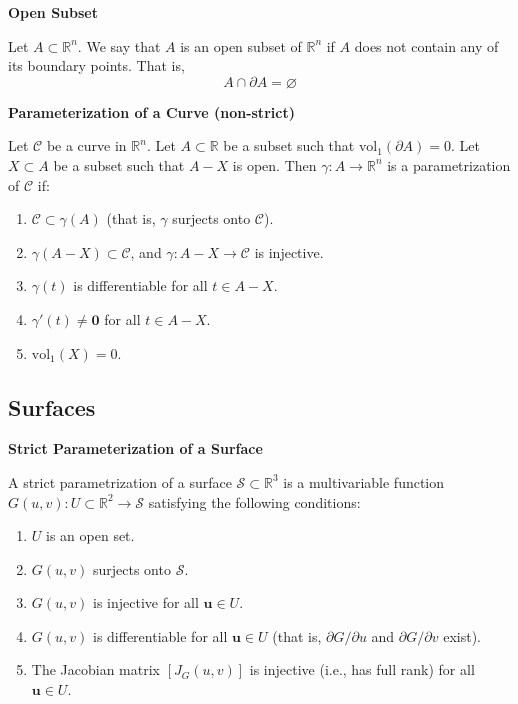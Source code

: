 \documentclass{article}
\newenvironment{definition}[1]{
    \par\noindent\textbf{#1}\par\noindent
}{
    \par \vspace{0.5cm}
}
\begin{document}
\begin{definition}{Open Subset}
Let \(A \subset \mathbb{R}^n\). We say that \(A\) is an open subset of \(\mathbb{R}^n\) if \(A\) does not contain any of its boundary points. That is,
\[ A \cap \partial A = \varnothing \]
\end{definition}

\begin{definition}{Parameterization of a Curve (non-strict)}
Let \(\mathcal{C}\) be a curve in \(\mathbb{R}^n\). Let \(A \subset \mathbb{R}\) be a subset such that \(\text{vol}_1(\partial A) = 0\). Let \(X \subset A\) be a subset such that \(A - X\) is open. Then \(\gamma: A \to \mathbb{R}^n\) is a parametrization of \(\mathcal{C}\) if:
\begin{enumerate}
    \item \(\mathcal{C} \subset \gamma(A)\) (that is, \(\gamma\) surjects onto \(\mathcal{C}\)).
    \item \(\gamma(A - X) \subset \mathcal{C}\), and \(\gamma: A - X \to \mathcal{C}\) is injective.
    \item \(\gamma(t)\) is differentiable for all \(t \in A - X\).
    \item \(\gamma'(t) \neq \bm{0}\) for all \(t \in A - X\).
    \item \(\text{vol}_1(X) = 0\).
\end{enumerate}
\end{definition}



\subsection{Surfaces}

\begin{definition}{Strict Parameterization of a Surface}
A strict parametrization of a surface \(\mathcal{S} \subset \mathbb{R}^3\) is a multivariable function \(G(u, v) : U \subset \mathbb{R}^2 \to \mathcal{S}\) satisfying the following conditions:
\begin{enumerate}
    \item \(U\) is an open set.
    \item \(G(u, v)\) surjects onto \(\mathcal{S}\).
    \item \(G(u, v)\) is injective for all \(\bm{u} \in U\).
    \item \(G(u, v)\) is differentiable for all \(\bm{u} \in U\) (that is, \(\partial G/\partial u\) and \(\partial G/\partial v\) exist).
    \item The Jacobian matrix \([J_G(u, v)]\) is injective (i.e., has full rank) for all \(\bm{u} \in U\).
\end{enumerate}
\end{definition}
\end{document}
